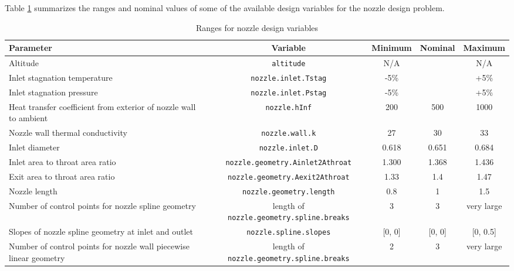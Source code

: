 \documentclass{article}
\begin{document}
Table \ref{tab:nozzleRanges} summarizes the ranges and nominal values of some of the available design variables for the nozzle design problem.

\begin{landscape}

\begin{table}
\caption{Ranges for nozzle design variables}
\label{tab:nozzleRanges}
\begin{center}
\begin{tabular}[]{p{4cm} | c | c | c | c}
Parameter & Variable & Minimum & Nominal & Maximum \\
\hline
Altitude & \texttt{altitude} & N/A &  & N/A \\ \hline
Inlet stagnation temperature & \texttt{nozzle.inlet.Tstag} & -5\% &  & +5\% \\ \hline
Inlet stagnation pressure & \texttt{nozzle.inlet.Pstag} & -5\% &  & +5\% \\ \hline
Heat transfer coefficient from exterior of nozzle wall to ambient & \texttt{nozzle.hInf} & 200 & 500 & 1000 \\ \hline
Nozzle wall thermal conductivity & \texttt{nozzle.wall.k} & 27 & 30 & 33 \\ \hline
Inlet diameter & \texttt{nozzle.inlet.D} & 0.618 & 0.651 & 0.684 \\ \hline
Inlet area to throat area ratio & \texttt{nozzle.geometry.Ainlet2Athroat} & 1.300 & 1.368 & 1.436 \\ \hline
Exit area to throat area ratio & \texttt{nozzle.geometry.Aexit2Athroat} & 1.33 & 1.4 & 1.47 \\ \hline
Nozzle length & \texttt{nozzle.geometry.length} & 0.8 & 1 & 1.5 \\ \hline
Number of control points for nozzle spline geometry & length of \texttt{nozzle.geometry.spline.breaks} & 3 & 3 & very large \\ \hline
Slopes of nozzle spline geometry at inlet and outlet & \texttt{nozzle.spline.slopes} & [0, 0] & [0, 0] & [0, 0.5] \\ \hline
Number of control points for nozzle wall piecewise linear geometry & length of \texttt{nozzle.geometry.spline.breaks} & 2 & 3 & very large \\ \hline
\end{tabular}
\end{center}
\end{table}

\end{landscape}
\end{document}

